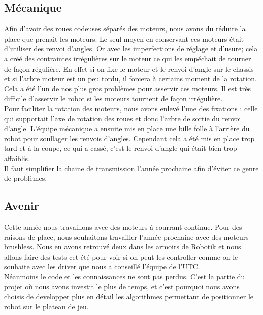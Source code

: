 \subsection{Mécanique}
Afin d'avoir des roues codeuses séparés des moteurs, nous avons du réduire la place que prenait les moteurs. Le seul moyen en conservant ces moteurs était d'utiliser des renvoi d'angles. Or avec les imperfections de réglage et d'usure; cela a créé des contraintes irrégulières sur le moteur ce qui les empéchait de tourner de façon régulière. En effet si on fixe le moteur et le renvoi d'angle sur le chassis et si l'arbre moteur est un peu tordu, il forcera à certains moment de la rotation. Cela a été l'un de nos plus gros problèmes pour asservir ces moteurs. Il est très difficile d'asservir le robot si les moteurs tournent de façon irrégulière.\\

Pour faciliter la rotation des moteurs, nous avons enlevé l'une des fixations : celle qui supportait l'axe de rotation des roues et donc l'arbre de sortie du renvoi d'angle. L'équipe mécanique a ensuite mis en place une bille folle à l'arrière du robot pour soullager les renvois d'angles. Cependant cela a été mis en place trop tard et à la coupe, ce qui a cassé, c'est le renvoi d'angle qui était bien trop affaiblis. \\

Il faut simplifier la chaine de transmission l'année prochaine afin d'éviter ce genre de problèmes. 

\subsection{Avenir}
Cette année nous travaillons avec des moteurs à courrant continue. Pour des raisons de place, nous souhaitons travailler l'année prochaine avec des moteurs brushless. Nous en avons retrouvé deux dans les armoirs de Robotik et nous allons faire des tests cet été pour voir si on peut les controller comme on le souhaite avec les driver que nous a conseillé l'équipe de l'UTC.\\

Néanmoins le code et les connaissances ne sont pas perdus. C'est la partie du projet où nous avons investit le plus de temps, et c'est pourquoi nous avons choisis de developper plus en détail les algorithmes permettant de positionner le robot sur le plateau de jeu.